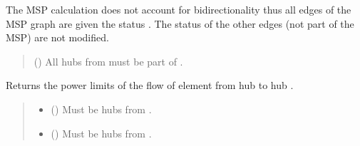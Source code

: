 \documentclass[letterpaper,10pt,english]{sphinxmanual}
\begin{document}
\begin{fulllineitems}
\begin{fulllineitems}
\sphinxAtStartPar
The MSP calculation does not account for bidirectionality thus all edges of the MSP graph are given
the status .
The status of the other edges (not part of the MSP) are not modified.
\begin{quote}\begin{description}
\sphinxAtStartPar
{} (\sphinxstyleliteralemphasis{\sphinxupquote{, }}) \textendash{} All hubs from  must be part of .

\end{description}\end{quote}

\end{fulllineitems}


\begin{fulllineitems}
\label{\detokenize{generated/tamos.network.HREThermalNetwork:tamos.network.HREThermalNetwork.get_connection_power_bounds}}
\pysigstartsignatures
{}
\pysigstopsignatures
\sphinxAtStartPar
Returns the power limits of the flow of element from hub  to hub .
\begin{quote}\begin{description}
\begin{itemize}
\item {} 
\sphinxAtStartPar
{} ({\hyperref[\detokenize{generated/tamos.Hub:tamos.Hub}]{}}) \textendash{} Must be hubs from .

\item {} 
\sphinxAtStartPar
{} ({\hyperref[\detokenize{generated/tamos.Hub:tamos.Hub}]{}}) \textendash{} Must be hubs from .


\end{itemize}
\end{description}
\end{quote}
\end{fulllineitems}
\end{fulllineitems}
\end{document}
